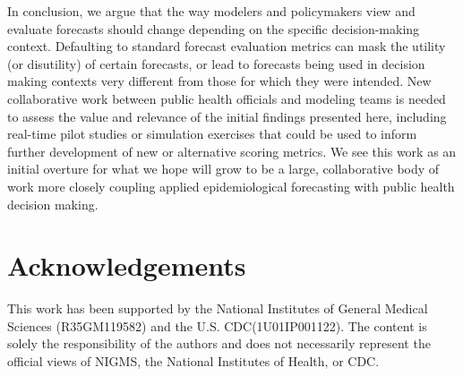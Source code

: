 \documentclass{article}\usepackage[]{graphicx}\usepackage[]{xcolor}
\begin{document}
In conclusion, we argue that the way modelers and policymakers view and evaluate forecasts should change depending on the specific decision-making context.
Defaulting to standard forecast evaluation metrics can mask the utility (or disutility) of certain forecasts, or lead to forecasts being used in decision making contexts very different from those for which they were intended.
New collaborative work between public health officials and modeling teams is needed to assess the value and relevance of the initial findings presented here, including real-time pilot studies or simulation exercises that could be used to inform further development of new or alternative scoring metrics.
We see this work as an initial overture for what we hope will grow to be a large, collaborative body of work more closely coupling applied epidemiological forecasting with public health decision making.

\section*{Acknowledgements}
This work has been supported by the National Institutes of General Medical Sciences (R35GM119582) and the U.S. CDC(1U01IP001122). The content is solely the responsibility of the authors and does not necessarily represent the official views of NIGMS, the National Institutes of Health, or CDC.


\end{document}
